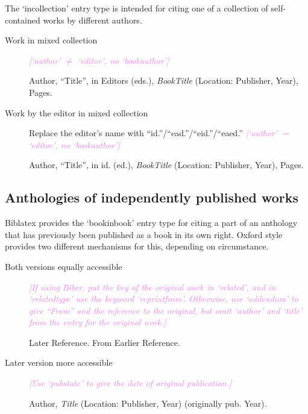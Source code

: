 \documentclass[extrafontsizes,11pt,a4paper,oneside]{memoir}
\newcommand*{\lit}[1]{\textsf{#1}}
\newcommand*{\code}[1]{`\textsf{#1}'}
\newcommand*{\aside}[1]{\textcolor{violet}{\emph{[#1]}}}
\begin{document}
The \code{incollection} entry type is intended for citing one of a collection of self-contained works by different authors.

\begin{description}
  \item[Work in mixed collection] \aside{\code{author} $\neq$ \code{editor}, no \code{bookauthor}}
  \par Author, \enquote{Title}, \lit{in} Editors (\lit{eds.}), \emph{BookTitle} (Location: Publisher, Year), Pages.
  \\
  
  \item[Work by the editor in mixed collection] Replace the editor's name with \enquote{id.}\slash \enquote{ead.}\slash \enquote{eid.}\slash \enquote{eaed.} \aside{\code{author} $=$ \code{editor}, no \code{bookauthor}}
  \par Author, \enquote{Title}, \lit{in id.} (\lit{ed.}), \emph{BookTitle} (Location: Publisher, Year), Pages.
  \\
  
\end{description}

\subsection{Anthologies of independently published works}

Biblatex provides the \code{bookinbook} entry type for citing a part of an anthology that has previously been published as a book in its own right. Oxford style provides two different mechanisms for this, depending on circumstance.

\begin{description}
  \item[Both versions equally accessible] \aside{If using Biber, put the key of the original work in \code{related}, and in \code{relatedtype} use the keyword \code{reprintfrom}. Otherwise, use \code{addendum} to give \enquote{From} and the reference to the original, but omit \code{author} and \code{title} from the entry for the original work.}\par
  Later Reference. From Earlier Reference.
  \\
  \item[Later version more accessible] \aside{Use \code{pubstate} to give the date of original publication.}\par
  \par Author, \emph{Title} (Location: Publisher, Year) (\lit{originally pub.} Year).
  \\
\end{description}
\end{document}

